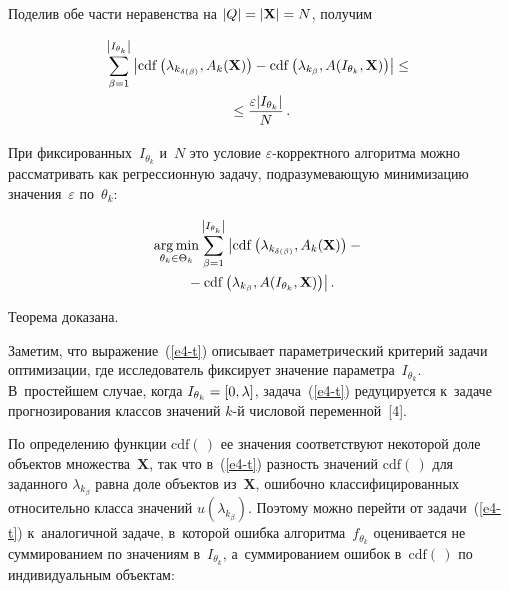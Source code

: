 \begin{multicols}{2}
\vspace*{-3pt}

\noindent
 Поделив обе части 
неравенства на $\vert Q \vert \hm= \vert\mathbf{X}\vert \hm= N$, 
получим 

\vspace*{-6pt}

\noindent
\begin{multline*}
\sum\limits_{\beta=1}^{\left\vert I_{\theta_k}\right\vert} \left\vert 
\mathrm{cdf}\left( \lambda_{k_{\delta(\beta)}}, 
{A}_k(\mathbf{X})\right)- \mathrm{cdf}\left( \lambda_{k_\beta}, 
{A}(I_{\theta_k}, \mathbf{X})\right)\right\vert \leq{}\\
{}\leq \displaystyle\frac{\displaystyle \varepsilon\vert 
I_{\theta_k} \vert \mathstrut}{\displaystyle N\mathstrut}\,.
\end{multline*}

\vspace*{-3pt}

\noindent
 При фиксированных~$I_{\theta_k}$ и~$N$ это условие 
$\varepsilon$-кор\-рект\-но\-го алгоритма можно рассматривать как 
регрессионную задачу, подразумевающую минимизацию 
значения~$\varepsilon$ по~$\theta_k$:

\vspace*{-6pt}

\noindent
     \begin{multline}
     \mathop{\mathrm{arg}\,\mathrm{min}}\limits_{\theta_k\in \Theta_k} \sum\limits_{\beta=1}^{\left\vert 
I_{\theta_k} \right\vert} \left\vert \mathrm{cdf}\left( \lambda_{k_{\delta(\beta)}}, 
{A}_k(\mathbf{X})\right) - {}\right.\\
\left.{}- \mathrm{cdf}\left( \lambda_{k_\beta}, 
{A}( I_{\theta_k},\mathbf{X})\right)\right\vert.
     \label{e4-t}
     \end{multline}
     
     \vspace*{-3pt}

\noindent
Теорема доказана.

\smallskip
     
     Заметим, что выражение~(\ref{e4-t}) описывает параметрический 
критерий задачи оптимизации, где исследователь фиксирует значение 
параметра~$I_{\theta_k}$. В~простейшем случае, когда $I_{\theta_k} \hm= 
[0,\lambda]$, задача~(\ref{e4-t}) редуцируется к~задаче прогнозирования классов 
значений $k$-й числовой переменной~[4].
     
     По определению функции $\mathrm{cdf}(\,)$ ее значения соответствуют 
некоторой доле объектов множества~$\mathbf{X}$, так что в~(\ref{e4-t}) 
разность значений $\mathrm{cdf}(\,)$ для заданного $\lambda_{k_\beta}$ равна 
доле объектов из~$\mathbf{X}$, ошибочно классифицированных относительно 
класса значений $u(\lambda_{k_\beta})$. Поэтому можно перейти от 
задачи~(\ref{e4-t}) к~аналогичной задаче, в~которой ошибка 
алгоритма~$f_{\theta_k}$ оценивается не суммированием по значениям 
в~$I_{\theta_k}$, а~суммированием ошибок в~$\mathrm{cdf}(\,)$ по 
индивидуальным объектам:


\end{multicols}
